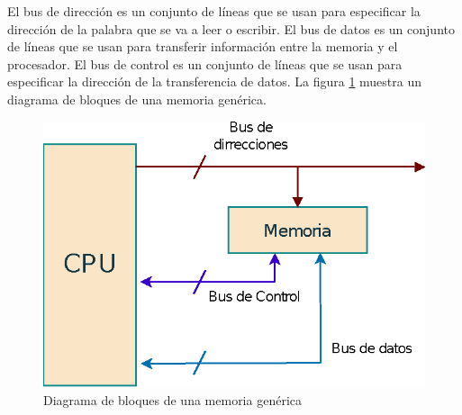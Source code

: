 El bus de dirección es un conjunto de líneas que se usan para especificar la dirección de la palabra que se va a leer o escribir. El bus de datos es un conjunto de líneas que se usan para transferir información entre la memoria y el procesador. El bus de control es un conjunto de líneas que se usan para especificar la dirección de la transferencia de datos. La figura \ref{fig:memfoto5} muestra un diagrama de bloques de una memoria genérica.

\begin{figure}[h]
\centering
\includegraphics[scale=0.9]{img/buses.eps}
\caption{Diagrama de bloques de una memoria genérica}
\label{fig:memfoto5}
\end{figure}